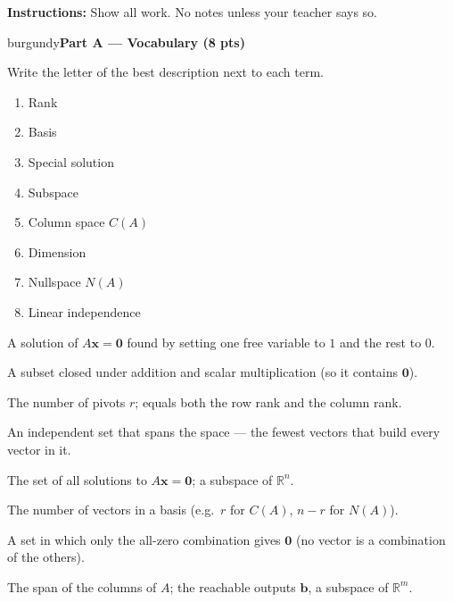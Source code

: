 \documentclass[10pt]{article}
\newcommand{\bb}{\mathbf{b}}
\newcommand{\xx}{\mathbf{x}}
\newcommand{\zero}{\mathbf{0}}
\newcommand{\parthead}[1]{%
  \vspace{6pt}\noindent
  \begin{headlinebox}{burgundy}{\color{white}\bfseries #1}\end{headlinebox}%
  \vspace{4pt}}
\begin{document}
\namedateperiod

\vspace{0.06in}
\noindent\textbf{Instructions:} Show all work. No notes unless your teacher says so.

\parthead{Part A --- Vocabulary (8 pts)}
Write the letter of the best description next to each term.

\vspace{4pt}
\noindent
\begin{minipage}[t]{0.40\textwidth}
\begin{enumerate}[leftmargin=2.2em, itemsep=7pt, label=\arabic*.]
  \item Rank 
  \item Basis 
  \item Special solution 
  \item Subspace 
  \item Column space $C(A)$ 
  \item Dimension 
  \item Nullspace $N(A)$ 
  \item Linear independence 
\end{enumerate}
\end{minipage}%
\hfill
\begin{minipage}[t]{0.57\textwidth}
\small
\begin{description}[leftmargin=1.4em, itemsep=3pt]
  \item[(A)] A solution of $A\xx=\zero$ found by setting one free variable to $1$ and the rest to $0$.
  \item[(B)] A subset closed under addition and scalar multiplication (so it contains $\zero$).
  \item[(C)] The number of pivots $r$; equals both the row rank and the column rank.
  \item[(D)] An independent set that spans the space --- the fewest vectors that build every vector in it.
  \item[(E)] The set of all solutions to $A\xx=\zero$; a subspace of $\mathbb{R}^n$.
  \item[(F)] The number of vectors in a basis (e.g.\ $r$ for $C(A)$, $n-r$ for $N(A)$).
  \item[(G)] A set in which only the all-zero combination gives $\zero$ (no vector is a combination of the others).
  \item[(H)] The span of the columns of $A$; the reachable outputs $\bb$, a subspace of $\mathbb{R}^m$.
\end{description}
\end{minipage}
\end{document}
